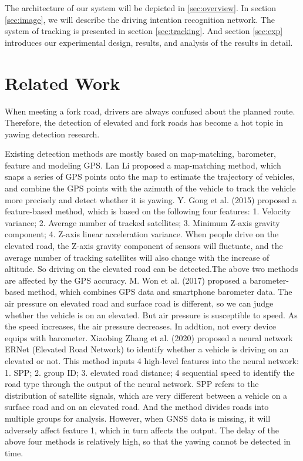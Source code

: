 \documentclass[journal]{IEEEtran}
\begin{document}
The architecture of our system will be depicted in \ref{sec:overview}.
In section \ref{sec:image}, we will describe the driving intention recognition network.
The system of tracking is presented in section \ref{sec:tracking}.
And section \ref{sec:exp} introduces our experimental design, results, and analysis of the results in detail.

\section{Related Work}
When meeting a fork road, drivers are always confused about the planned route. Therefore, the detection of elevated and fork roads has become a hot topic in yawing detection research.

Existing detection methods are mostly based on map-matching, barometer, feature and modeling GPS.
Lan Li \cite{li2012azimuth} proposed a map-matching method, which snaps a series of GPS points onto the map to estimate the trajectory of vehicles, and combine the GPS points with the azimuth of the vehicle to track the vehicle more precisely and detect whether it is yawing. Y. Gong et al. (2015) \cite{gong2015deel} proposed a feature-based method, which is based on the following four features: 1. Velocity variance; 2. Average number of tracked satellites; 3. Minimum Z-axis gravity component; 4. Z-axis linear acceleration variance. When people drive on the elevated road, the Z-axis gravity component of sensors will fluctuate, and the average number of tracking satellites will also change with the increase of altitude. So driving on the elevated road can be detected.The above two methods are affected by the GPS accuracy. M. Won et al. (2017) \cite{won2017hybridbaro} proposed a barometer-based method, which combines GPS data and smartphone barometer data. The air pressure on elevated road and surface road is different, so we can judge whether the vehicle is on an elevated. But air pressure is susceptible to speed. As the speed increases, the air pressure decreases. In addtion, not every device equips with barometer. Xiaobing Zhang et al. (2020) \cite{zhang2020elevated} proposed a neural network ERNet (Elevated Road Network) to identify whether a vehicle is driving on an elevated or not. This method inputs 4 high-level features into the neural network: 1. SPP; 2. group ID; 3. elevated road distance; 4 sequential speed to identify the road type through the output of the neural network. SPP refers to the distribution of satellite signals, which are very different between a vehicle on a surface road and on an elevated road. And the method divides roads into multiple groups for analysis. However, when GNSS data is missing, it will adversely affect feature 1, which in turn affects the output. The delay of the above four methods is relatively high, so that the yawing cannot be detected in time.
\end{document}

